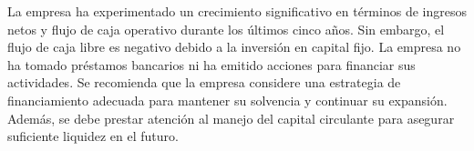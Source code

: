 La empresa ha experimentado un crecimiento significativo en términos de ingresos netos y flujo de caja operativo durante los últimos cinco años. Sin embargo, el flujo de caja libre es negativo debido a la inversión en capital fijo. La empresa no ha tomado préstamos bancarios ni ha emitido acciones para financiar sus actividades. Se recomienda que la empresa considere una estrategia de financiamiento adecuada para mantener su solvencia y continuar su expansión. Además, se debe prestar atención al manejo del capital circulante para asegurar suficiente liquidez en el futuro.